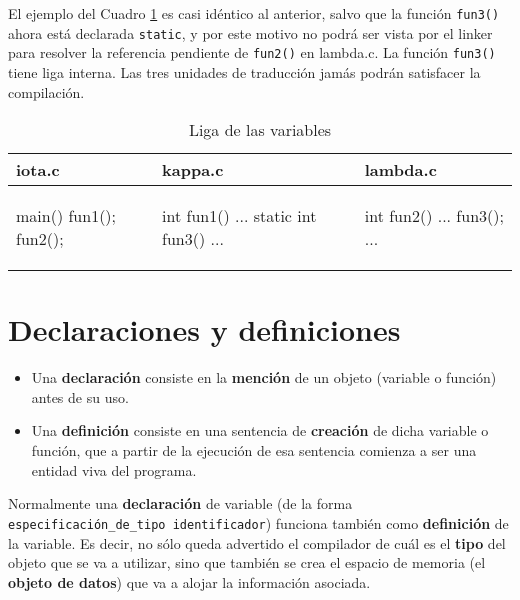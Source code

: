 \begin{ejemplo}
El ejemplo del Cuadro \ref{tab:ejliga2} es casi idéntico al anterior, salvo que la función \texttt{fun3()} ahora está declarada \texttt{static}, y por este motivo no podrá ser vista por el linker para resolver la referencia pendiente de \texttt{fun2()} en
lambda.c. La función \texttt{fun3()} tiene liga interna. Las tres unidades de traducción jamás podrán satisfacer la compilación.

\begin{table}
\centering	
\begin{tabular}{l|l|l}
iota.c & kappa.c & lambda.c \\
\hline
\begin{codecell}
main()
{
	fun1();
	fun2();
}
\end{codecell}
&
\begin{codecell}
int fun1()
{
	...
}
static int fun3()
{
	...
}
\end{codecell}
&
\begin{codecell}
int fun2()
{
	...
	fun3();
	...
}
\end{codecell}
\\
\end{tabular}
 \caption{Liga de las variables}
 \label{tab:ejliga2} 
\end{table}
\end{ejemplo}


\section{Declaraciones y definiciones}
\begin{itemize}
	\item Una \textbf{declaración} consiste en la \textbf{mención} de un objeto (variable o función) antes de su uso.
	\item Una \textbf{definición} consiste en una sentencia de \textbf{creación} de dicha variable o función, que a partir de la ejecución de esa sentencia comienza a ser una entidad viva del programa.
\end{itemize}


Normalmente una \textbf{declaración} de variable (de la forma \texttt{especificación\_de\_tipo identificador}) funciona
también como \textbf{definición} de la variable. Es decir, no sólo queda advertido el compilador de cuál es el
\textbf{tipo} del objeto que se va a utilizar, sino que también se crea el espacio de memoria (el \textbf{objeto de datos})
que va a alojar la información asociada.

